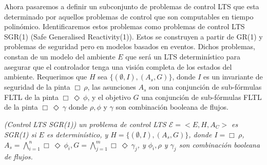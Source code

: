 Ahora pasaremos a definir un subconjunto de problemas de control LTS que esta determinado por aquellos problemas de
control que son computables en tiempo polinómico. Identificaremos estos problemas como problemas de control LTS SGR(1)
(Safe Generalised Reactivity(1)). Estos se construyen a partir de GR(1) y problemas de seguridad pero en modelos basados
en eventos. Dichos problemas, constan de un modelo del ambiente $E$ que será un LTS determinístico para asegurar que el
controlador tenga una visión completa de los estados del ambiente. Requerimos que $H$ sea $\{(\emptyset,I),(A_s,G)\}$,
donde $I$ es un invariante de seguridad de la pinta $\Box\ \rho$, las asunciones $A_s$ son una conjunción de sub-fórmulas
FLTL de la pinta $\Box\ \Diamond\ \phi$, y el objetivo $G$ una conjunción de sub-fórmulas FLTL de la pinta $\Box\ \Diamond\ \gamma$
donde $\rho,\phi$ y $\gamma$ son combinación booleana de flujos.

\begin{nahaDef}
    \emph{(Control LTS SGR(1)) un problema de control LTS $\mathcal{E} = <E,H,A_C>$ es SGR(1) si $E$ es
    determinístico, y $H = \{(\emptyset,I),(A_s,G)\}$, donde $I = \Box\ \rho$, $A_s = \bigwedge_{i=1}^{n}
    \Box\ \Diamond\ \phi_i, G = \bigwedge_{j=1}^{m}\Box\ \Diamond\ \gamma_j$, y $\phi_i, \rho$ y $\gamma_j$ son combinación
    booleana de flujos.}
\end{nahaDef}


